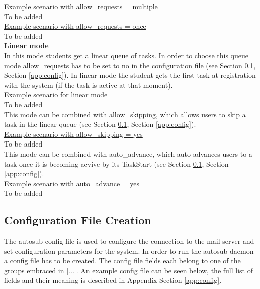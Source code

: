 \underline{Example scenario with allow\_requests = multiple}\\
To be added
\\

\underline{Example scenario with allow\_requests = once}\\
To be added
\\

\textbf{Linear mode}\\
In this mode students get a linear queue of tasks. In order to choose this queue mode allow\_requests has to be set to
no in the configuration file (see Section \ref{sub:exampleconfig}, Section \ref{app:config}). In linear mode the student
gets the first task at registration with the system (if the task is active at that moment).\\

\underline{Example scenario for linear mode}\\
To be added
\\

This mode can be combined with allow\_skipping, which allows users to skip a task in the linear queue 
(see Section \ref{sub:exampleconfig}, Section \ref{app:config}). \\

\underline{Example scenario with allow\_skipping = yes}\\
To be added
\\

This mode can be combined with auto\_advance, which auto advances users to a task once it is becoming acvive by its
TaskStart (see Section \ref{sub:exampleconfig}, Section \ref{app:config}). \\

\underline{Example scenario with auto\_advance = yes}\\
To be added

\subsection{Configuration File Creation} \label{sub:exampleconfig}
The autosub config file is used to configure the connection to the mail server and set
configuration parameters for the system. In order to run the autosub daemon a config file
has to be created. The config file fields each belong to one of the groups embraced 
in [...]. An example config file can be seen below, the full list of fields and their
meaning is described in Appendix Section \ref{app:config}.

